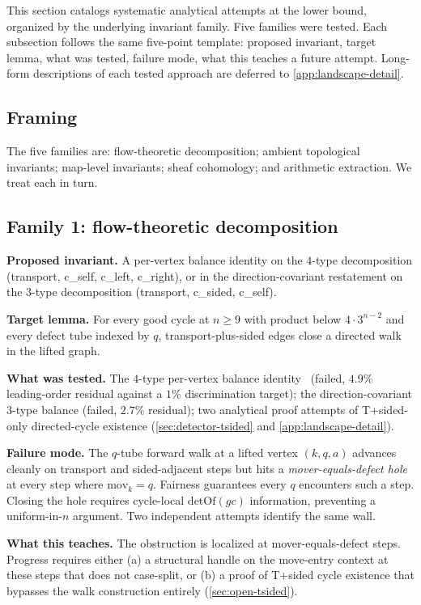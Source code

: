 \documentclass[11pt,a4paper]{article}
\theoremstyle{plain}
\theoremstyle{definition}
\newcommand{\detOf}{\mathrm{detOf}}
\begin{document}
This section catalogs systematic analytical attempts at the lower
bound, organized by the underlying invariant family.  Five families
were tested.  Each subsection follows the same five-point template:
proposed invariant, target lemma, what was tested, failure mode, what
this teaches a future attempt.  Long-form descriptions of each tested
approach are deferred to \cref{app:landscape-detail}.

\subsection{Framing}\label{sec:landscape-framing}

The five families are: flow-theoretic decomposition; ambient
topological invariants; map-level invariants; sheaf cohomology; and
arithmetic extraction.  We treat each in turn.

\subsection{Family 1: flow-theoretic decomposition}\label{sec:landscape-flow}

\textbf{Proposed invariant.} A per-vertex balance identity on the
$4$-type decomposition (transport, c\_self, c\_left, c\_right), or in
the direction-covariant restatement on the $3$-type decomposition
(transport, c\_sided, c\_self).

\textbf{Target lemma.} For every good cycle at $n \ge 9$ with product
below $4 \cdot 3^{n-2}$ and every defect tube indexed by $q$,
transport-plus-sided edges close a directed walk in the lifted graph.

\textbf{What was tested.} The $4$-type per-vertex balance
identity~\cite{HaddadKnuth1985} (failed, $4.9\%$ leading-order
residual against a $1\%$ discrimination target); the
direction-covariant $3$-type balance (failed, $2.7\%$ residual); two
analytical proof attempts of T+sided-only directed-cycle existence
(\cref{sec:detector-tsided} and \cref{app:landscape-detail}).

\textbf{Failure mode.} The $q$-tube forward walk at a lifted vertex
$(k, q, a)$ advances cleanly on transport and sided-adjacent steps but
hits a \emph{mover-equals-defect hole} at every step where
$\mathrm{mov}_k = q$.  Fairness guarantees every $q$ encounters such a
step.  Closing the hole requires cycle-local $\detOf(gc)$ information,
preventing a uniform-in-$n$ argument.  Two independent attempts identify
the same wall.

\textbf{What this teaches.} The obstruction is localized at
mover-equals-defect steps.  Progress requires either (a) a structural
handle on the move-entry context at these steps that does not
case-split, or (b) a proof of T+sided cycle existence that bypasses the
walk construction entirely (\cref{sec:open-tsided}).
\end{document}
